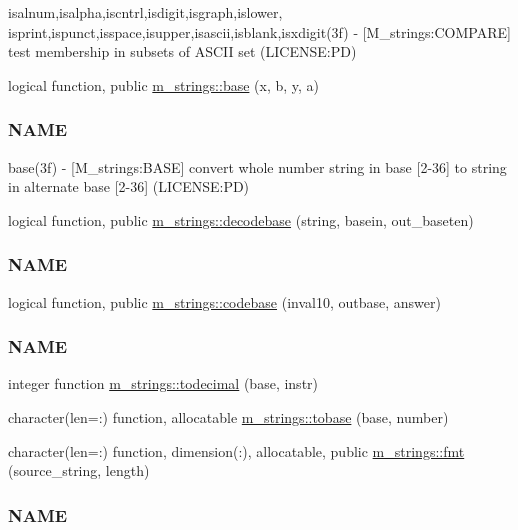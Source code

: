 \begin{DoxyCompactItemize}
\begin{DoxyCompactList}
isalnum,isalpha,iscntrl,isdigit,isgraph,islower, isprint,ispunct,isspace,isupper,isascii,isblank,isxdigit(3f) -\/ \mbox{[}M\+\_\+strings\+:C\+O\+M\+P\+A\+RE\mbox{]} test membership in subsets of A\+S\+C\+II set (L\+I\+C\+E\+N\+SE\+:PD) \end{DoxyCompactList}\item 
logical function, public \mbox{\hyperlink{namespacem__strings_a635ef6f1dd73400e7b339392886d6357}{m\+\_\+strings\+::base}} (x, b, y, a)
\begin{DoxyCompactList}\small\item\em \subsubsection*{N\+A\+ME}

base(3f) -\/ \mbox{[}M\+\_\+strings\+:B\+A\+SE\mbox{]} convert whole number string in base \mbox{[}2-\/36\mbox{]} to string in alternate base \mbox{[}2-\/36\mbox{]} (L\+I\+C\+E\+N\+SE\+:PD) \end{DoxyCompactList}\item 
logical function, public \mbox{\hyperlink{namespacem__strings_a3883dae1b85c2d4a09d2d7e46ff422ab}{m\+\_\+strings\+::decodebase}} (string, basein, out\+\_\+baseten)
\begin{DoxyCompactList}\small\item\em \subsubsection*{N\+A\+ME}\end{DoxyCompactList}\item 
logical function, public \mbox{\hyperlink{namespacem__strings_a3a022b64dc902dc6043e3f265ee78e38}{m\+\_\+strings\+::codebase}} (inval10, outbase, answer)
\begin{DoxyCompactList}\small\item\em \subsubsection*{N\+A\+ME}\end{DoxyCompactList}\item 
integer function \mbox{\hyperlink{namespacem__strings_aded6e43ae13ff21d76c1739f01a40a63}{m\+\_\+strings\+::todecimal}} (base, instr)
\item 
character(len=\+:) function, allocatable \mbox{\hyperlink{namespacem__strings_aa896d221112afb3dbc90eeca6075b282}{m\+\_\+strings\+::tobase}} (base, number)
\item 
character(len=\+:) function, dimension(\+:), allocatable, public \mbox{\hyperlink{namespacem__strings_afccf1e453a4315a639f133f2f7c0078b}{m\+\_\+strings\+::fmt}} (source\+\_\+string, length)
\begin{DoxyCompactList}\small\item\em \subsubsection*{N\+A\+ME}


\end{DoxyCompactList}
\end{DoxyCompactItemize}
